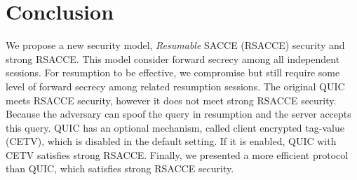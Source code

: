 \section{Conclusion} \label{sec:conclusion}

We propose a new security model, \textit{Resumable} SACCE (RSACCE) security and strong RSACCE.
This model consider forward secrecy among all independent sessions.
For resumption to be effective, we compromise but still require
some level of forward secrecy among related resumption sessions.
The original QUIC meets RSACCE security, however it does not meet strong RSACCE security.
Because the adversary can spoof the query in resumption and the server accepts this query.
QUIC has an optional mechanism, called client encrypted tag-value (CETV), which is disabled in the default setting.
If it is enabled, QUIC with CETV satisfies strong RSACCE.
Finally, we presented a more efficient protocol than QUIC, which satisfies strong RSACCE security.